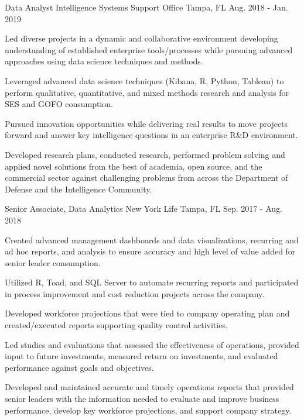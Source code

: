 \begin{cventries}
  \cventry
    {Data Analyst} %
    {Intelligence Systems Support Office} %
    {Tampa, FL} %
    {Aug. 2018 - Jan. 2019} %
    {
      \begin{cvitems} %
        \item {Led diverse projects in a dynamic and collaborative environment developing understanding of established enterprise tools/processes while pursuing advanced approaches using data science techniques and methods.}
        \item {Leveraged advanced data science techniques (Kibana, R, Python, Tableau) to perform qualitative, quantitative, and mixed methods research and analysis for SES and GOFO consumption.}
        \item {Pursued innovation opportunities while delivering real results to move projects forward and answer key intelligence questions in an enterprise R\&D environment.}
        \item {Developed research plans, conducted research, performed problem solving and applied novel solutions from the best of academia, open source, and the commercial sector against challenging problems from across the Department of Defense and the Intelligence Community.}
      \end{cvitems}
    }

  \cventry
    {Senior Associate, Data Analytics} %
    {New York Life} %
    {Tampa, FL} %
    {Sep. 2017 - Aug. 2018} %
    {
      \begin{cvitems} %
        \item {Created advanced management dashboards and data visualizations, recurring and ad hoc reports, and analysis to ensure accuracy and high level of value added for senior leader consumption.}
        \item {Utilized R, Toad, and SQL Server to automate recurring reports and participated in process improvement and cost reduction projects across the company.}
        \item {Developed workforce projections that were tied to company operating plan and created/executed reports supporting quality control activities.}
        \item {Led studies and evaluations that assessed the effectiveness of operations, provided input to future investments, measured return on investments, and evaluated performance against goals and objectives.}
        \item {Developed and maintained accurate and timely operations reports that provided senior leaders with the information needed to evaluate and improve business performance, develop key workforce projections, and support company strategy.}
      \end{cvitems}
    }


\end{cventries}
